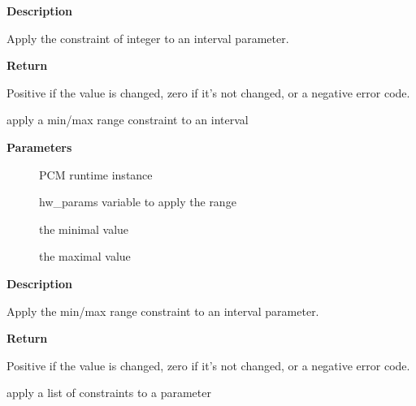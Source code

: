 \documentclass[a4paper,8pt,english]{sphinxmanual}
\begin{document}
\textbf{Description}

Apply the constraint of integer to an interval parameter.

\textbf{Return}

Positive if the value is changed, zero if it's not changed, or a
negative error code.

\begin{fulllineitems}
\label{sound/kernel-api/alsa-driver-api:c.snd_pcm_hw_constraint_minmax}
apply a min/max range constraint to an interval

\end{fulllineitems}


\textbf{Parameters}
\begin{description}
\item[{}] \leavevmode
PCM runtime instance

\item[{}] \leavevmode
hw\_params variable to apply the range

\item[{}] \leavevmode
the minimal value

\item[{}] \leavevmode
the maximal value

\end{description}

\textbf{Description}

Apply the min/max range constraint to an interval parameter.

\textbf{Return}

Positive if the value is changed, zero if it's not changed, or a
negative error code.

\begin{fulllineitems}
\label{sound/kernel-api/alsa-driver-api:c.snd_pcm_hw_constraint_list}
apply a list of constraints to a parameter

\end{fulllineitems}
\end{document}

